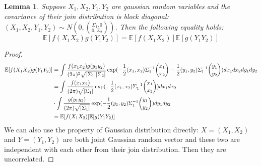 \documentclass{article}
\DeclarePairedDelimiter\abs{\lvert}{\rvert}
\def\E{\mathbb{E}}
\newtheorem{lemma}{Lemma}
\begin{document}
\begin{lemma}\label{lem:abcd}
Suppose $X_1, X_2, Y_1, Y_2$ are gaussian random variables and the covariance of their join distribution is block diagonal:
$(X_1, X_2, Y_1, Y_2) \sim N(0, \binom{\Sigma_1, 0}{0, \Sigma_2})$. Then the following equality holds:
\begin{equation}
\E[f(X_1X_2)g(Y_1Y_2)] = \E[f(X_1 X_2)] \E[g(Y_1 Y_2)]
\end{equation}
\end{lemma}
\begin{proof}
\begin{align*}
\E[f(X_1X_2)g(Y_1Y_2)] & = \int \frac{f(x_1 x_2) g(y_1 y_2) }{(2\pi)^2 \sqrt{\abs{\Sigma_1}\abs{\Sigma_2}}}\exp(-\frac{1}{2}(x_1, x_2) \Sigma_1^{-1} \binom{x_1}{x_2}-\frac{1}{2}(y_1, y_2) \Sigma_1^{-1} \binom{y_1}{y_2})dx_1 d x_2 dy_1 dy_2 \\
& = \int \frac{f(x_1 x_2)  }{(2\pi) \sqrt{\abs{\Sigma_1}}}\exp(-\frac{1}{2}(x_1, x_2) \Sigma_1^{-1} \binom{x_1}{x_2})dx_1 d x_2  \\
&\cdot  \int \frac{ g(y_1 y_2)  }{(2\pi) \sqrt{\abs{\Sigma_1}}}\exp(-\frac{1}{2}(y_1, y_2) \Sigma_1^{-1} \binom{y_1}{y_2})dy_1 d y_2 \\
& = \E[f(X_1 X_2)] \E[g(Y_1 Y_2)]
\end{align*}
We can also use the property of Gaussian distribution directly: $X=(X_1, X_2)$ and $Y=(Y_1, Y_2)$ are both joint Gaussian random vector and these two are independent with each other from their join distribution. Then they are uncorrelated.
\end{proof}
\end{document}
